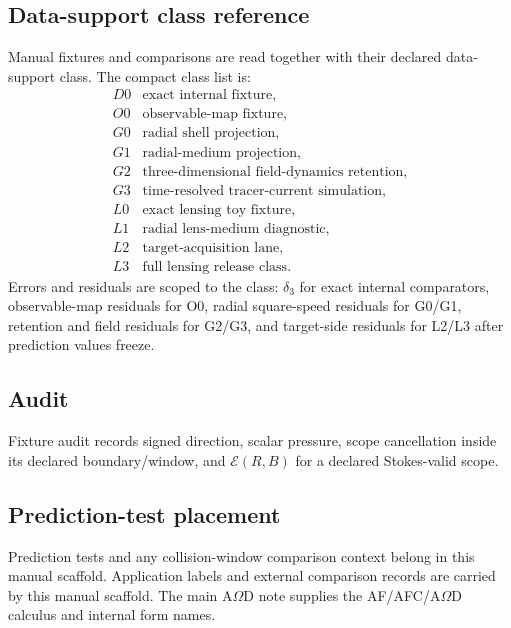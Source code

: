 \subsection{Data-support class reference}\label{manual:app:data-support-class-reference}
Manual fixtures and comparisons are read together with their declared data-support class. The compact class list is:
\[
\begin{array}{c|l}
D0 & \text{exact internal fixture},\\
O0 & \text{observable-map fixture},\\
G0 & \text{radial shell projection},\\
G1 & \text{radial-medium projection},\\
G2 & \text{three-dimensional field-dynamics retention},\\
G3 & \text{time-resolved tracer-current simulation},\\
L0 & \text{exact lensing toy fixture},\\
L1 & \text{radial lens-medium diagnostic},\\
L2 & \text{target-acquisition lane},\\
L3 & \text{full lensing release class}.
\end{array}
\]
Errors and residuals are scoped to the class: \(\delta_3\) for exact internal comparators, observable-map residuals for O0, radial square-speed residuals for G0/G1, retention and field residuals for G2/G3, and target-side residuals for L2/L3 after prediction values freeze.

\subsection{Audit}\label{manual:simfix:falsification}
Fixture audit records signed direction, scalar pressure, scope cancellation inside its declared boundary/window, and \(\mathcal E(R,B)\) for a declared Stokes-valid scope.


\subsection{Prediction-test placement}
Prediction tests and any collision-window comparison context belong in this manual scaffold. Application labels and external comparison records are carried by this manual scaffold. The main A\(\Omega\)D note supplies the AF/AFC/A\(\Omega\)D calculus and internal form names.
